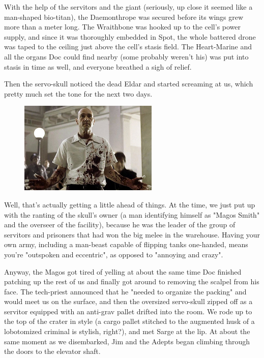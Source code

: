 With the help of the servitors and the giant (seriously, up close it seemed like a man-shaped bio-titan), the Daemonthrope was secured before its wings grew more than a meter long. 
The Wraithbone was hooked up to the cell's power supply, and since it was thoroughly embedded in Spot, the whole battered drone was taped to the ceiling just above the cell's stasis field. 
The Heart-Marine and all the organs Doc could find nearby (some probably weren't his) was put into stasis in time as well, and everyone breathed a sigh of relief.

Then the servo-skull noticed the dead Eldar and started screaming at us, which pretty much set the tone for the next two days.

\begin{figure}
	\begin{center}
		\includegraphics[width=\figwidth]{pics/16/61.png}
	\end{center}
\end{figure}
Well, that's actually getting a little ahead of things. 
At the time, we just put up with the ranting of the skull's owner (a man identifying himself as "Magos Smith" and the overseer of the facility), because he was the leader of the group of servitors and prisoners that had won the big melee in the warehouse. 
Having your own army, including a man-beast capable of flipping tanks one-handed, means you're "outspoken and eccentric", as opposed to "annoying and crazy".

Anyway, the Magos got tired of yelling at about the same time Doc finished patching up the rest of us and finally got around to removing the scalpel from his face. 
The tech-priest announced that he "needed to organize the packing" and would meet us on the surface, and then the oversized servo-skull zipped off as a servitor equipped with an anti-grav pallet drifted into the room. 
We rode up to the top of the crater in style (a cargo pallet stitched to the augmented husk of a lobotomized criminal is stylish, right?), and met Sarge at the lip. 
At about the same moment as we disembarked, Jim and the Adepts began climbing through the doors to the elevator shaft. 


